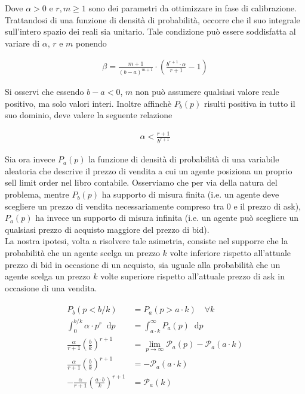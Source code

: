 \documentclass[paper=a4, fontsize=11pt]{scrartcl}
\newcommand*\diff{\mathop{}\!\mathrm{d}}
\numberwithin{equation}{section}
\numberwithin{figure}{section}
\numberwithin{table}{section}
\begin{document}
Dove $\alpha > 0$ e $r, m \geq 1$ sono dei parametri da ottimizzare in fase di calibrazione. Trattandosi di una funzione di densità di probabilità, occorre che il suo integrale sull'intero spazio dei reali sia unitario. Tale condizione può essere soddisfatta al variare di $\alpha$, $r$ e $m$ ponendo

\begin{align}
\beta = \frac{m+1}{(b-a)^{m+1}} \cdot \left(\frac{b^{r+1}\cdot\alpha}{r+1}-1\right)
\end{align}

Si osservi che essendo $b - a < 0$, $m$ non può assumere qualsiasi valore reale positivo, ma solo valori interi. Inoltre affinchè $P_b(p)$ risulti positiva in tutto il suo dominio, deve valere la seguente relazione

\begin{align}
\alpha < \frac{r+1}{b^{r+1}}
\end{align}

Sia ora invece $P_a(p)$ la funzione di densità di probabilità di una variabile aleatoria che descrive il prezzo di vendita a cui un agente posiziona un proprio sell limit order nel libro contabile. Osserviamo che per via della natura del problema, mentre $P_b(p)$ ha supporto di misura finita (i.e. un agente deve scegliere un prezzo di vendita necessariamente compreso tra $0$ e il prezzo di ask), $P_a(p)$ ha invece un supporto di misura infinita (i.e. un agente può scegliere un qualsiasi prezzo di acquisto maggiore del prezzo di bid).\\

La nostra ipotesi, volta a risolvere tale asimetria, consiste nel supporre che la probabilità che un agente scelga un prezzo $k$ volte inferiore rispetto all'attuale prezzo di bid in occasione di un acquisto, sia uguale alla probabilità che un agente scelga un prezzo $k$ volte superiore rispetto all'attuale prezzo di ask in occasione di una vendita.

\begin{align}
\begin{split}
P_b(p < b / k) & = P_a(p > a \cdot k) \quad \forall k \\
\int_0^{b/k} \alpha \cdot p^r \diff p & = \int_{a \cdot k}^\infty P_a(p) \diff p \\
\frac{\alpha}{r+1} \left(\frac{b}{k}\right)^{r+1} & = \lim_{p \to \infty} \mathcal{P}_a(p) - \mathcal{P}_a(a \cdot k) \\
\frac{\alpha}{r+1} \left(\frac{b}{k}\right)^{r+1} & = - \mathcal{P}_a(a \cdot k) \\
- \frac{\alpha}{r+1} \left(\frac{a \cdot b}{k}\right)^{r+1} & = \mathcal{P}_a(k)
\end{split}
\end{align}
\end{document}
